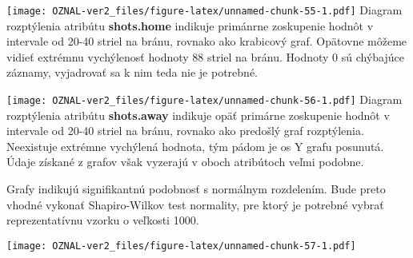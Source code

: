 \documentclass[
]{article}
\newenvironment{Shaded}{\begin{snugshade}}{\end{snugshade}}
\newcommand{\AttributeTok}[1]{\textcolor[rgb]{0.77,0.63,0.00}{#1}}
\newcommand{\ConstantTok}[1]{\textcolor[rgb]{0.00,0.00,0.00}{#1}}
\newcommand{\DecValTok}[1]{\textcolor[rgb]{0.00,0.00,0.81}{#1}}
\newcommand{\FloatTok}[1]{\textcolor[rgb]{0.00,0.00,0.81}{#1}}
\newcommand{\FunctionTok}[1]{\textcolor[rgb]{0.00,0.00,0.00}{#1}}
\newcommand{\NormalTok}[1]{#1}
\newcommand{\OtherTok}[1]{\textcolor[rgb]{0.56,0.35,0.01}{#1}}
\newcommand{\SpecialCharTok}[1]{\textcolor[rgb]{0.00,0.00,0.00}{#1}}
\newcommand{\StringTok}[1]{\textcolor[rgb]{0.31,0.60,0.02}{#1}}
\begin{document}
\texttt{[image: OZNAL-ver2\_files/figure-latex/unnamed-chunk-55-1.pdf]}
Diagram rozptýlenia atribútu \textbf{shots.home} indikuje primánrne
zoskupenie hodnôt v intervale od 20-40 striel na bránu, rovnako ako
krabicový graf. Opätovne môžeme vidieť extrémnu vychýlenosť hodnoty 88
striel na bránu. Hodnoty 0 sú chýbajúce záznamy, vyjadrovať sa k nim
teda nie je potrebné.

\begin{Shaded}
\end{Shaded}

\texttt{[image: OZNAL-ver2\_files/figure-latex/unnamed-chunk-56-1.pdf]}
Diagram rozptýlenia atribútu \textbf{shots.away} indikuje opäť primárne
zoskupenie hodnôt v intervale od 20-40 striel na bránu, rovnako ako
predošlý graf rozptýlenia. Neexistuje extrémne vychýlená hodnota, tým
pádom je os Y grafu posunutá. Údaje získané z grafov však vyzerajú v
oboch atribútoch veľmi podobne.

Grafy indikujú signifikantnú podobnosť s normálnym rozdelením. Bude
preto vhodné vykonať Shapiro-Wilkov test normality, pre ktorý je
potrebné vybrať reprezentatívnu vzorku o veľkosti 1000.

\begin{Shaded}
\end{Shaded}

\texttt{[image: OZNAL-ver2\_files/figure-latex/unnamed-chunk-57-1.pdf]}

\begin{Shaded}
\end{Shaded}
\end{document}
